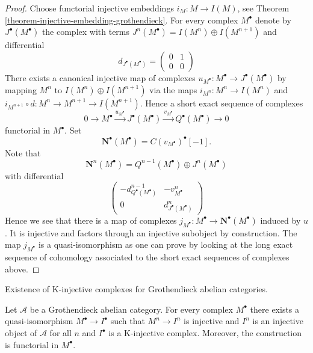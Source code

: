 \begin{proof}
Choose functorial injective embeddings $i_M : M \to I(M)$, see
Theorem \ref{theorem-injective-embedding-grothendieck}.
For every complex $M^\bullet$ denote by $J^\bullet(M^\bullet)$ the complex
with terms $J^n(M^\bullet) = I(M^n) \oplus I(M^{n + 1})$ and differential
$$
d_{J^\bullet(M^\bullet)} =
\left(
\begin{matrix}
0 & 1 \\
0 & 0
\end{matrix}
\right)
$$
There exists a canonical injective map of complexes
$u_{M^\bullet} : M^\bullet \to J^\bullet(M^\bullet)$ by mapping $M^n$ to
$I(M^n) \oplus I(M^{n + 1})$ via the maps $i_{M^n} : M^n \to I(M^n)$ and
$i_{M^{n + 1}} \circ d : M^n \to M^{n + 1} \to I(M^{n + 1})$. Hence a
short exact sequence of complexes
$$
0 \to M^\bullet \xrightarrow{u_{M^\bullet}}
J^\bullet(M^\bullet) \xrightarrow{v_{M^\bullet}}
Q^\bullet(M^\bullet) \to 0
$$
functorial in $M^\bullet$. Set
$$
\mathbf{N}^\bullet(M^\bullet) = C(v_{M^\bullet})^\bullet[-1].
$$
Note that
$$
\mathbf{N}^n(M^\bullet) = Q^{n - 1}(M^\bullet) \oplus J^n(M^\bullet)
$$
with differential
$$
\left(
\begin{matrix}
- d^{n - 1}_{Q^\bullet(M^\bullet)} & - v^n_{M^\bullet} \\
0 & d^n_{J^\bullet(M^\bullet)}
\end{matrix}
\right)
$$
Hence we see that there is a map of complexes
$j_{M^\bullet} : M^\bullet \to \mathbf{N}^\bullet(M^\bullet)$
induced by $u$. It is injective and factors through an injective subobject
by construction. The map $j_{M^\bullet}$ is a quasi-isomorphism as one
can prove by looking at the long exact sequence of cohomology associated
to the short exact sequences of complexes above.
\end{proof}

\begin{theorem}
\label{theorem-K-injective-embedding-grothendieck}
\begin{slogan}
Existence of K-injective complexes for Grothendieck abelian categories.
\end{slogan}
Let $\mathcal{A}$ be a Grothendieck abelian category.
For every complex $M^\bullet$ there exists a quasi-isomorphism
$M^\bullet \to I^\bullet$ such that $M^n \to I^n$ is injective and $I^n$
is an injective object of $\mathcal{A}$ for all $n$ and $I^\bullet$
is a K-injective complex. Moreover, the construction is functorial in
$M^\bullet$.
\end{theorem}

